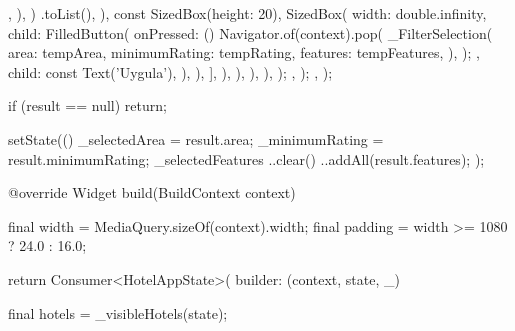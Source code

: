\documentclass[11pt,a4paper]{article}
\begin{document}
\begin{codeblock}
{{{{{                                  },
                                ),
                              )
                              .toList(),
                        ),
                        const SizedBox(height: 20),
                        SizedBox(
                          width: double.infinity,
                          child: FilledButton(
                            onPressed: () {
                              Navigator.of(context).pop(
                                _FilterSelection(
                                  area: tempArea,
                                  minimumRating: tempRating,
                                  features: tempFeatures,
                                ),
                              );
                            },
                            child: const Text('Uygula'),
                          ),
                        ),
                      ],
                    ),
                  ),
                ),
              ),
            );
          },
        );
      },
    );

    if (result == null) {
      return;
    }

    setState(() {
      _selectedArea = result.area;
      _minimumRating = result.minimumRating;
      _selectedFeatures
        ..clear()
        ..addAll(result.features);
    });
  }

  @override
  Widget build(BuildContext context) {
    final width = MediaQuery.sizeOf(context).width;
    final padding = width >= 1080 ? 24.0 : 16.0;

    return Consumer<HotelAppState>(
      builder: (context, state, _) {
        final hotels = _visibleHotels(state);

}}}
\end{codeblock}
\end{document}
